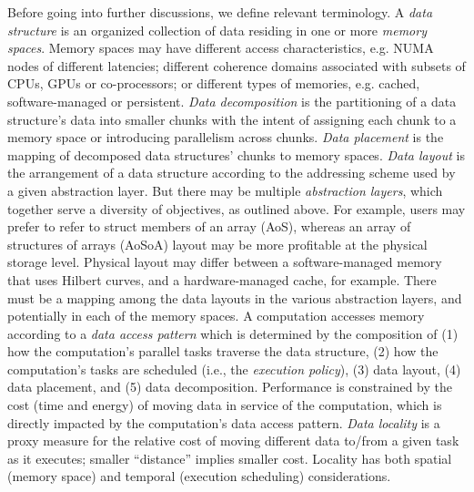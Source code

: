 Before going into further discussions, we define relevant terminology. 
%
%
A {\em data structure} is an organized collection of data residing in one or more {\em memory spaces}.
%
Memory spaces may have different access characteristics, e.g. NUMA nodes of different latencies; different coherence domains associated with subsets of CPUs, GPUs or co-processors; or different types of memories, e.g. cached, software-managed or persistent.
%
{\em Data decomposition} is the partitioning of a data structure's data into smaller chunks with the intent of assigning each chunk to a memory space or introducing parallelism across chunks. 
%
{\em Data placement} is the mapping of decomposed data structures' chunks to memory spaces.
%
%
%
{\em Data layout} is the arrangement of a data structure according to the addressing scheme used by a given abstraction layer.  But there may be multiple {\em abstraction layers}, which together serve a diversity of objectives, as outlined above.  For example, users may prefer to refer to struct members of an array (AoS), whereas an array of structures of arrays (AoSoA) layout may be more profitable at the physical storage level.  Physical layout may differ between a software-managed memory that uses Hilbert curves, and a hardware-managed cache, for example.  There must be a mapping among the data layouts in the various abstraction layers, and potentially in each of the memory spaces.
%
A computation accesses memory according to a {\em data access pattern} which is determined by the composition of (1) how the computation's parallel tasks traverse the data structure,
(2) how the computation's tasks are scheduled (i.e., the {\em execution policy}), 
(3) data layout,
(4) data placement, and
(5) data decomposition.
%
Performance is constrained by the cost (time and energy) of moving data in service of the computation, which is directly impacted by the computation's data access pattern.
%
{\em Data locality} is a proxy measure for the relative cost of moving different data to/from a given task as it executes; smaller ``distance'' implies smaller cost.
%
Locality has both spatial (memory space) and temporal (execution scheduling) considerations.

  
  
